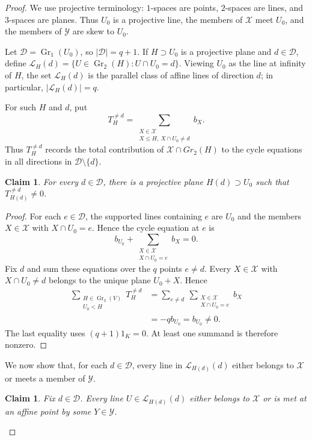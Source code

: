 \documentclass[11pt]{article}
\numberwithin{equation}{section}
\newtheorem{claim}[theorem]{Claim}
\newcommand{\Gr}{\operatorname{Gr}}
\begin{document}
\begin{proof}
We use projective terminology: $1$-spaces are points, $2$-spaces are
lines, and $3$-spaces are planes. Thus $U_0$ is a projective line, the
members of $\mathcal X$ meet $U_0$, and the members of $\mathcal Y$ are
skew to $U_0$.

Let $\mathcal D=\Gr_1(U_0)$, so $|\mathcal D|=q+1$. If
$H\supset U_0$ is a projective plane and $d\in\mathcal D$, define
$\mathcal L_H(d)=\{U\in\Gr_2(H):U\cap U_0=d\}$. Viewing $U_0$ as the
line at infinity of $H$, the set $\mathcal L_H(d)$ is the parallel
class of affine lines of direction $d$; in particular,
$|\mathcal L_H(d)|=q$.

For such $H$ and $d$, put
\[
 T_H^{\ne d}
 =
 \sum_{\substack{X\in\mathcal X\\X\le H,\ X\cap U_0\ne d}} b_X.
\]
Thus $T_H^{\ne d}$ records the total contribution of $\mathcal{X} \cap Gr_2(H)$ to the cycle equations in all directions in $\mathcal D \setminus \{d\}$.

\begin{claim}\label{cl:choose-plane}
For every $d\in\mathcal D$, there is a projective plane $H(d)\supset U_0$ such
that $T_{H(d)}^{\ne d}\ne0$.
\end{claim}

\begin{proof}
For each $e\in\mathcal D$, the supported lines containing $e$ are
$U_0$ and the members $X\in\mathcal X$ with $X\cap U_0=e$. Hence the
cycle equation at $e$ is
\[
 b_{U_0}+\sum_{\substack{X\in\mathcal X\\X\cap U_0=e}}b_X=0.
\]
Fix $d$ and sum these equations over the $q$ points $e\ne d$. Every
$X\in\mathcal X$ with $X\cap U_0\ne d$ belongs to the unique plane
$U_0+X$. Hence
\begin{align*}
 \sum_{\substack{H\in\Gr_3(V)\\U_0<H}}T_H^{\ne d}
 &=
 \sum_{e\ne d}\ \sum_{\substack{X\in\mathcal X\\X\cap U_0=e}}b_X\\
 &=-q b_{U_0}=b_{U_0}\ne0.
\end{align*}
The last equality uses $(q+1)1_K=0$.
At least one summand is therefore nonzero.
\end{proof}

We now show that, for each $d\in\mathcal D$, every line in
$\mathcal L_{H(d)}(d)$ either belongs to $\mathcal X$ or meets a
member of $\mathcal Y$.
\begin{claim}\label{cl:parallel-line}
Fix $d\in\mathcal D$. Every line
$U\in\mathcal L_{H(d)}(d)$ either belongs to $\mathcal X$ or is met
at an affine point by some $Y\in\mathcal Y$.
\end{claim}


\end{proof}
\end{document}
